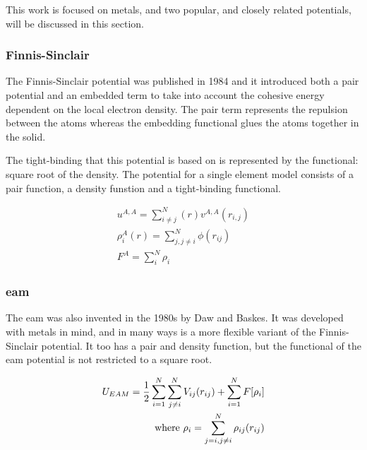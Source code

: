 This work is focused on metals, and two popular, and closely related potentials, will be discussed in this section.

\subsubsection{Finnis-Sinclair}
\label{section:FinnisSinclair}

The Finnis-Sinclair potential was published in 1984\cite{finnissinclair} and it introduced both a pair potential and an embedded term to take into account the cohesive energy dependent on the local electron density.  The pair term represents the repulsion between the atoms whereas the embedding functional glues the atoms together in the solid.  

The tight-binding that this potential is based on is represented by the functional: square root of the density.  The potential for a single element model consists of a pair function, a density funstion and a tight-binding functional.

\begin{equation}
\begin{split}
u^{A,A} = \sum_{i \ne j}^{N}(r) v^{A,A}(r_{i,j}) \\
\rho^{A}_{i}(r) = \sum_{j, j \ne i}^{N} \phi(r_{ij}) \\
F^{A} = \sum_{i}^{N} \rho_i
\end{split}
\label{eq:eqFinnisSinclair}
\end{equation}


\subsubsection{\Acrlong{eam}}
\label{section:EAM}

The \acrlong{eam} was also invented in the 1980s by Daw and Baskes.  It was developed with metals in mind, and in many ways is a more flexible variant of the Finnis-Sinclair potential.  It too has a pair and density function, but the functional of the \acrshort{eam} potential is not restricted to a square root.

\begin{equation}
\begin{split}
U_{EAM} = \frac{1}{2} \sum \limits_{i=1}^{N} \sum \limits_{j\ne i}^{N} V_{ij}(r_{ij}) + \sum \limits_{i=1}^{N} F[\rho _{i}] \\
\textnormal{where   } \rho_{i} = \sum \limits_{j=i,j \ne i}^{N} \rho_{ij}(r_{ij})
\end{split}
\label{eq:eqEAM}
\end{equation}

